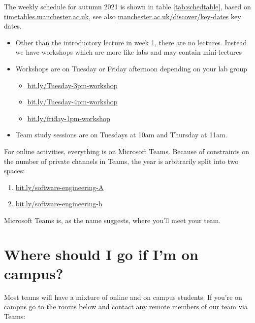 \documentclass[
]{book}
\providecommand{\tightlist}{%
  \setlength{\itemsep}{0pt}\setlength{\parskip}{0pt}}
\begin{document}
The weekly schedule for autumn 2021 is shown in table \ref{tab:schedtable}, based on \href{https://timetables.manchester.ac.uk/}{timetables.manchester.ac.uk}, see also \href{https://www.manchester.ac.uk/discover/key-dates/}{manchester.ac.uk/discover/key-dates} key dates.

\begin{itemize}
\tightlist
\item
  Other than the introductory lecture in week 1, there are no lectures. Instead we have workshops which are more like labs and may contain mini-lectures
\item
  Workshops are on Tuesday or Friday afternoon depending on your lab group

  \begin{itemize}
  \tightlist
  \item
    \href{http://bit.ly/Tuesday-3pm-workshop}{bit.ly/Tuesday-3pm-workshop}
  \item
    \href{http://bit.ly/Tuesday-4pm-workshop}{bit.ly/Tuesday-4pm-workshop}
  \item
    \href{http://bit.ly/friday-1pm-workshop}{bit.ly/friday-1pm-workshop}
  \end{itemize}
\item
  Team study sessions are on Tuesdays at 10am and Thursday at 11am.
\end{itemize}

For online activities, everything is on Microsoft Teams. Because of constraints on the number of private channels in Teams, the year is arbitrarily split into two spaces:

\begin{enumerate}
\def\labelenumi{\arabic{enumi}.}
\tightlist
\item
  \href{https://bit.ly/software-engineering-A}{bit.ly/software-engineering-A}
\item
  \href{https://bit.ly/software-engineering-b}{bit.ly/software-engineering-b}
\end{enumerate}

Microsoft Teams is, as the name suggests, where you'll meet your team.

\hypertarget{campus}{%
\section{Where should I go if I'm on campus?}\label{campus}}

Most teams will have a mixture of online and on campus students. If you're on campus go to the rooms below and contact any remote members of our team via Teams:
\end{document}
